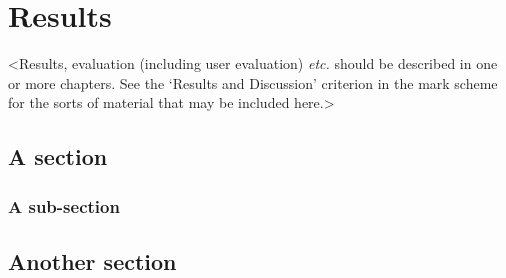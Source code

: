 \chapter{Results}
\label{chapter3}

<Results, evaluation (including user evaluation) {\em etc.} should be described in one or more chapters. See the `Results and Discussion' criterion in the mark scheme for the sorts of material that may be included here.>

\section{A section}
\lipsum[8]

\subsection{A sub-section}
\lipsum[11]

\section{Another section}
\lipsum[12]
